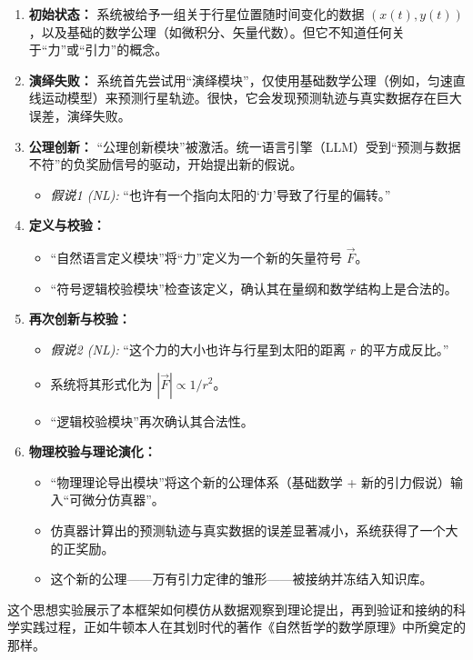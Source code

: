 \documentclass[11pt, a4paper]{article}
\begin{document}
\begin{enumerate}
	\item \textbf{初始状态：} 系统被给予一组关于行星位置随时间变化的数据 $(x(t), y(t))$，以及基础的数学公理（如微积分、矢量代数）。但它不知道任何关于“力”或“引力”的概念。
	
	\item \textbf{演绎失败：} 系统首先尝试用“演绎模块”，仅使用基础数学公理（例如，匀速直线运动模型）来预测行星轨迹。很快，它会发现预测轨迹与真实数据存在巨大误差，演绎失败。
	
	\item \textbf{公理创新：} “公理创新模块”被激活。统一语言引擎（LLM）受到“预测与数据不符”的负奖励信号的驱动，开始提出新的假说。
	\begin{itemize}
		\item \textit{假说1 (NL):} “也许有一个指向太阳的‘力’导致了行星的偏转。”
	\end{itemize}
	
	\item \textbf{定义与校验：}
	\begin{itemize}
		\item “自然语言定义模块”将“力”定义为一个新的矢量符号 $\vec{F}$。
		\item “符号逻辑校验模块”检查该定义，确认其在量纲和数学结构上是合法的。
	\end{itemize}
	
	\item \textbf{再次创新与校验：}
	\begin{itemize}
		\item \textit{假说2 (NL):} “这个力的大小也许与行星到太阳的距离 $r$ 的平方成反比。”
		\item 系统将其形式化为 $|\vec{F}| \propto 1/r^2$。
		\item “逻辑校验模块”再次确认其合法性。
	\end{itemize}
	
	\item \textbf{物理校验与理论演化：}
	\begin{itemize}
		\item “物理理论导出模块”将这个新的公理体系（基础数学 + 新的引力假说）输入“可微分仿真器”。
		\item 仿真器计算出的预测轨迹与真实数据的误差显著减小，系统获得了一个大的正奖励。
		\item 这个新的公理——万有引力定律的雏形——被接纳并冻结入知识库。
	\end{itemize}
\end{enumerate}
这个思想实验展示了本框架如何模仿从数据观察到理论提出，再到验证和接纳的科学实践过程，正如牛顿本人在其划时代的著作《自然哲学的数学原理》中所奠定的那样\cite{newton1687principia}。
\end{document}
